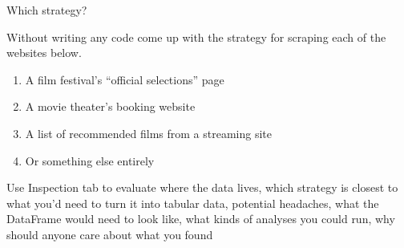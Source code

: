 \documentclass[9pt,aspectratio=169]{beamer}
\begin{document}
\begin{frame}{Which strategy?}

    Without writing any code come up with the strategy for scraping each of the websites below.
    \begin{enumerate}
        \item A film festival's ``official selections'' page
        \item A movie theater's booking website
        \item A list of recommended films from a streaming site
        \item Or something else entirely
    \end{enumerate}

    \bigskip

    Use Inspection tab to evaluate where the data lives, which strategy is closest to what you'd need to turn it into tabular data, potential headaches, what the DataFrame would need to look like, what kinds of analyses you could run, why should anyone care about what you found
\end{frame}
\end{document}
